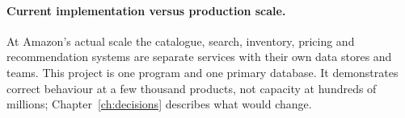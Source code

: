 \paragraph{Current implementation versus production scale.} At Amazon's actual scale the catalogue, search, inventory, pricing and recommendation systems are separate services with their own data stores and teams. This project is one program and one primary database. It demonstrates correct behaviour at a few thousand products, not capacity at hundreds of millions; Chapter~\ref{ch:decisions} describes what would change.
